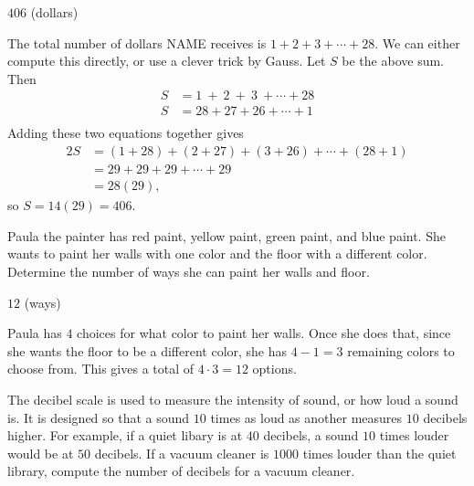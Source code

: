 \documentclass[11pt]{article}
\begin{document}
\begin{answer}
$\boxed{406}$ (dollars)
\end{answer}

\begin{solution}
The total number of dollars NAME receives is $1 + 2 + 3 + \cdots + 28$. We can either compute
this directly, or use a clever trick by Gauss. Let $S$ be the above sum. Then
\begin{align*}
S &= 1\ +\ 2\ +\ 3\ + \cdots + 28 \\
S &= 28 + 27 + 26 + \cdots + 1 \\
\end{align*}
Adding these two equations together gives
\begin{align*}
2S &= (1+28) + (2+27) + (3+26) + \cdots + (28+1) \\
&= 29 + 29 + 29 + \cdots + 29 \\
&= 28(29),
\end{align*}
so $S = 14(29) = \boxed{406}$.
\end{solution}


\begin{problem}
Paula the painter has red paint, yellow paint, green paint, and blue paint.
She wants to paint her walls with one color and the floor with a different color.
Determine the number of ways she can paint her walls and floor.
\end{problem}

\begin{answer}
$\boxed{12}$ (ways)
\end{answer}

\begin{solution}
Paula has $4$ choices for what color to paint her walls. Once she does that,
since she wants the floor to be a different color, she has $4-1 = 3$ remaining colors
to choose from. This gives a total of $4 \cdot 3 = \boxed{12}$ options.
\end{solution}


\begin{problem}
The decibel scale is used to measure the intensity of sound, or how loud a sound is.
It is designed so that a sound $10$ times as loud as another measures $10$ decibels higher.
For example, if a quiet libary is at $40$ decibels, a sound $10$ times louder would be 
at $50$ decibels. If a vacuum cleaner is $1000$ times louder than the quiet library, 
compute the number of decibels for a vacuum cleaner.
\end{problem}
\end{document}
